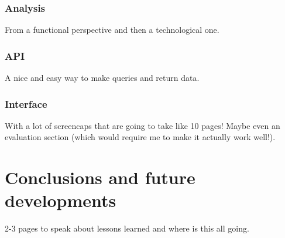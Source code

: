 \documentclass{UniVieCS_PhD} %
\begin{document}
	\subsubsection{Analysis}
	From a functional perspective and then a technological one.
	
	\subsubsection{API}
	A nice and easy way to make queries and return data.
	
	\subsubsection{Interface}
	With a lot of screencaps that are going to take like 10 pages! Maybe even an evaluation section (which would require me to make it actually work well!).
	
	\section{ Conclusions and future developments}
	2-3 pages to speak about lessons learned and where is this all going.
	
	\pagebreak
	
	
	
	
\end{document}
